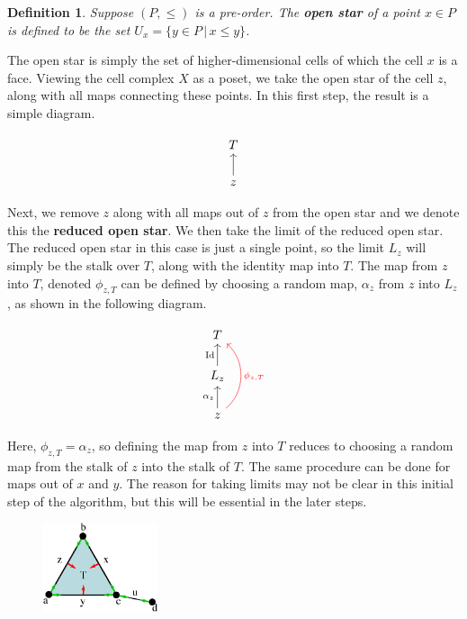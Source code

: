 \documentclass{article}
\newtheorem{definition}{Definition}
\theoremstyle{definition}
\begin{document}
\begin{definition}
Suppose $(P, \leq)$ is a pre-order. The \textbf{open star} of a point $x \in P$ is defined to be the set $U_x = \{y \in P \, | \, x \leq y\}$.
\end{definition}

The open star is simply the set of higher-dimensional cells of which the cell $x$ is a face. Viewing the cell complex $X$ as a poset, we take the open star of the cell $z$, along with all maps connecting these points. In this first step, the result is a simple diagram.

\[
\begin{tikzcd}
	T \\
	z \arrow{u}
\end{tikzcd}
\]

Next, we remove $z$ along with all maps out of $z$ from the open star and we denote this the \textbf{reduced open star}. We then take the limit of the reduced open star. The reduced open star in this case is just a single point, so the limit $L_z$  will simply be the stalk over $T$, along with the identity map into $T$. The map from $z$ into $T$, denoted $\phi_{z,T}$ can be defined by choosing a random map, $\alpha_z$ from $z$ into $L_z$, as shown in the following diagram. 

\[
\begin{tikzcd}
	T \\
	L_z \arrow{u}{\textrm{Id}}\\
	z \arrow{u}{\alpha_z} \arrow[bend right=50,swap,red]{uu}{\phi_{z,T}}
\end{tikzcd}
\]

Here, $\phi_{z,T} = \alpha_z$, so defining the map from $z$ into $T$ reduces to choosing a random map from the stalk of $z$ into the stalk of $T$. The same procedure can be done for maps out of $x$ and $y$. The reason for taking limits may not be clear in this initial step of the algorithm, but this will be essential in the later steps.\\

\begin{figure}[!htbp]
\centering
	\includegraphics[width=0.3\textwidth]{images/triangle_step2.eps}
\end{figure}
\end{document}
